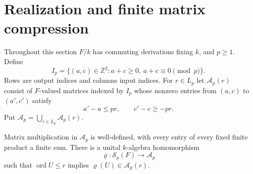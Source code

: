 \documentclass{article}
\newcommand{\ord}{\operatorname{ord}}
\newcommand{\Sf}{\mathcal S}
\newcommand{\Af}{\mathcal A}
\begin{document}
\section{Realization and finite matrix compression}\label{sec:matrix}
Throughout this section $F/k$ has commuting derivations fixing $k$, and $p\geq1$. Define
\[
 I_p=\{(a,c)\in\mathbb Z^2:a+c\geq0,\ a+c\equiv0\pmod p\}.
\]
Rows are output indices and columns input indices. For $r\in L_p$ let $\Af_p(r)$ consist of $F$-valued matrices indexed by $I_p$ whose nonzero entries from $(a,c)$ to $(a',c')$ satisfy
\[
 a'-a\leq pr,\qquad c'-c\geq-pr.
 \tag{6.1}\label{eq:jumps}
\]
Put $\Af_p=\bigcup_{r\in L_p}\Af_p(r)$.

\begin{lemma}\label{lem:realization}
Matrix multiplication in $\Af_p$ is well-defined, with every entry of every fixed finite product a finite sum. There is a unital $k$-algebra homomorphism
\[
 \varrho:\Sf_p(F)\longrightarrow\Af_p
\]
such that $\ord U\leq r$ implies $\varrho(U)\in\Af_p(r)$.
\end{lemma}
\end{document}
